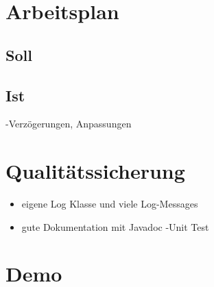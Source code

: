 \documentclass[12pt, utf8]{beamer}
\begin{document}
\section{Arbeitsplan}
\subsection{Soll}
\begin{frame}

\end{frame}
\subsection{Ist}
\begin{frame}


-Verzögerungen, Anpassungen
\end{frame}

\section{Qualitätssicherung}
\begin{frame}
\begin{itemize}
\item eigene Log Klasse und viele Log-Messages
\item gute Dokumentation mit Javadoc
-Unit Test
\end{itemize}
\end{frame}


\section{Demo}
\begin{frame}

\end{frame}
\end{document}

